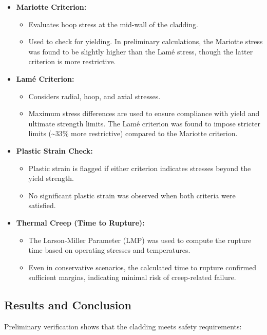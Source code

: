 \begin{itemize}
    \item \textbf{Mariotte Criterion:}
    \begin{itemize}
        \item Evaluates hoop stress at the mid-wall of the cladding.
        \item Used to check for yielding. In preliminary calculations, the Mariotte stress was found to be slightly higher than the Lamé stress, though the latter criterion is more restrictive.
    \end{itemize}

    \item \textbf{Lamé Criterion:}
    \begin{itemize}
        \item Considers radial, hoop, and axial stresses.
        \item Maximum stress differences are used to ensure compliance with yield and ultimate strength limits. The Lamé criterion was found to impose stricter limits (\textasciitilde33\% more restrictive) compared to the Mariotte criterion.
    \end{itemize}

    \item \textbf{Plastic Strain Check:}
    \begin{itemize}
        \item Plastic strain is flagged if either criterion indicates stresses beyond the yield strength.
        \item No significant plastic strain was observed when both criteria were satisfied.
    \end{itemize}

    \item \textbf{Thermal Creep (Time to Rupture):}
    \begin{itemize}
        \item The Larson-Miller Parameter (LMP) was used to compute the rupture time based on operating stresses and temperatures.
        \item Even in conservative scenarios, the calculated time to rupture confirmed sufficient margins, indicating minimal risk of creep-related failure.
    \end{itemize}
\end{itemize}

\subsection{Results and Conclusion}
Preliminary verification shows that the cladding meets safety requirements:

